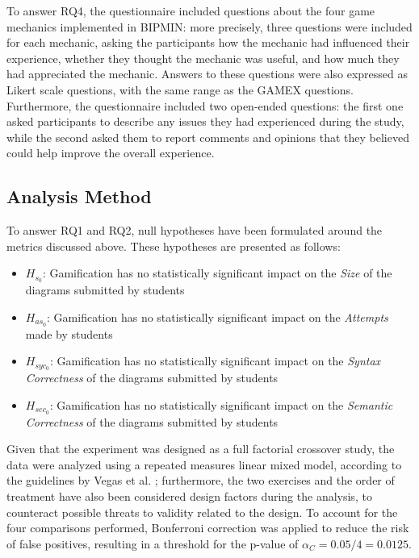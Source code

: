 To answer RQ4, the questionnaire included questions about the four game mechanics implemented in BIPMIN: more precisely, three questions were included for each mechanic, asking the participants how the mechanic had influenced their experience, whether they thought the mechanic was useful, and how much they had appreciated the mechanic. Answers to these questions were also expressed as Likert scale questions, with the same range as the GAMEX questions. Furthermore, the questionnaire included two open-ended questions: the first one asked participants to describe any issues they had experienced during the study, while the second asked them to report comments and opinions that they believed could help improve the overall experience. %

\subsection{Analysis Method}

To answer RQ1 and RQ2, null hypotheses have been formulated around the metrics discussed above. These hypotheses are presented as follows:

\begin{itemize}
    \item ${H_{s_{0}}}$: Gamification has no statistically significant impact on the \textit{Size} of the diagrams submitted by students
    \item ${H_{as_{0}}}$: Gamification has no statistically significant impact on the \textit{Attempts} made by students
    \item ${H_{syc_{0}}}$: Gamification has no statistically significant impact on the \textit{Syntax Correctness} of the diagrams submitted by students
    \item ${H_{sec_{0}}}$: Gamification has no statistically significant impact on the \textit{Semantic Correctness} of the diagrams submitted by students
\end{itemize}

Given that the experiment was designed as a full factorial crossover study, the data were analyzed using a repeated measures linear mixed model, according to the guidelines by Vegas et al. \cite{vegas2016crossover}; furthermore, the two exercises and the order of treatment have also been considered design factors during the analysis, to counteract possible threats to validity related to the design. To account for the four comparisons performed, Bonferroni correction was applied to reduce the risk of false positives, resulting in a threshold for the p-value of $\alpha_C = 0.05/4 = 0.0125$.

